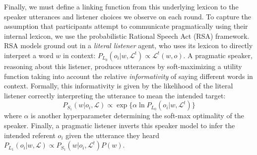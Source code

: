 \documentclass[10pt,letterpaper]{article}
\begin{document}

Finally, we must define a linking function from this underlying lexicon to the speaker utterances and listener choices we observe on each round. To capture the assumption that participants attempt to communicate pragmatically using their internal lexicon, we use the probabilistic Rational Speech Act (RSA) framework. RSA models ground out in a \emph{literal listener} agent, who uses its lexicon to directly interpret a word $w$ in context: $P_{L_0}(o_i | w, \mathcal{L}^t) \propto \mathcal{L}^t(w,o)$. A pragmatic speaker, reasoning about this listener, produces utterances by soft-maximizing a utility function taking into account the relative \emph{informativity} of saying different words in context. Formally, this informativity is given by the likelihood of the literal listener correctly interpreting the utterance to mean the intended target: $$P_{S_1}(w | o_i, \mathcal{L}) \propto \exp\{\alpha \ln P_{L_0}(o_i | w, \mathcal{L}^t)\}$$
where $\alpha$ is another hyperparameter determining the soft-max optimality of the speaker. Finally, a pragmatic listener inverts this speaker model to infer the intended referent $o_i$ given the utterance they heard $P_{L_1}(o_i | w, \mathcal{L}) \propto P_{S_1}(w | o_i, \mathcal{L}^t) P(w)$.

\end{document}
